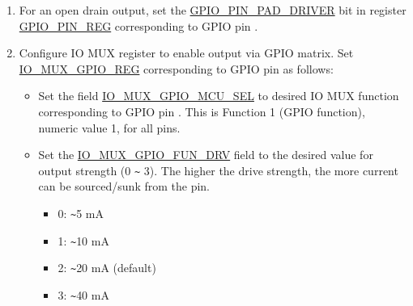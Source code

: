 \documentclass[main\_\_EN.tex]{subfiles}
\begin{document}
\begin{enumerate}
    \begin{itemize}
        \item Set the \hyperref[fielddesc:GPIOFUNCNOUTSEL]{GPIO\_FUNC\_OUT\_SEL} field in register \hyperref[regdesc:GPIOFUNCNOUTSELCFGREG]{GPIO\_FUNC\_OUT\_SEL\_CFG\_REG} to the index of the desired peripheral output signal .
        \item If the signal should always be enabled as an output, set the \hyperref[fielddesc:GPIOFUNCNOENSEL]{GPIO\_FUNC\_OEN\_SEL} bit in register \hyperref[regdesc:GPIOFUNCNOUTSELCFGREG]{GPIO\_FUNC\_OUT\_SEL\_CFG\_REG} and the bit in register \hyperref[regdesc:GPIOENABLEW1TSREG]{GPIO\_ENABLE\_W1TS\_REG}, corresponding to GPIO pin . To have the output enable signal decided by internal logic (for example, the SPIQ\_oe in column ``Output enable signal when \hyperref[fielddesc:GPIOFUNCNOENSEL]{GPIO\_FUNC\_OEN\_SEL} = 0" in Table \ref{tab:iomuxgpio-periph-signals-via-gpio-matrix}), clear the \hyperref[fielddesc:GPIOFUNCNOENSEL]{GPIO\_FUNC\_OEN\_SEL} bit instead.
       \item Set the corresponding bit in register \hyperref[regdesc:GPIOENABLEW1TCREG]{GPIO\_ENABLE\_W1TC\_REG} to disable the output from the GPIO pin.
    \end{itemize}
    \item For an open drain output, set the \hyperref[fielddesc:GPIOPINNPADDRIVER]{GPIO\_PIN\_PAD\_DRIVER} bit in register \hyperref[regdesc:GPIOPINNREG]{GPIO\_PIN\_REG} corresponding to GPIO pin .
    \item Configure IO MUX register to enable output via GPIO matrix. Set \hyperref[regdesc:IOMUXGPIONREG]{IO\_MUX\_GPIO\_REG} corresponding to GPIO pin  as follows:
    \begin{itemize}
        \item Set the field \hyperref[fielddesc:IOMUXGPIONMCUSEL]{IO\_MUX\_GPIO\_MCU\_SEL} to desired IO MUX function corresponding to GPIO pin . This is Function 1 (GPIO function), numeric value 1, for all pins.
        \item Set the \hyperref[fielddesc:IOMUXGPIONFUNDRV]{IO\_MUX\_GPIO\_FUN\_DRV} field to the desired value for output strength (0 \verb+~+ 3). The higher the drive strength, the more current can be sourced/sunk from the pin.
        \begin{itemize}
            \item 0: \verb+~+5 mA
            \item 1: \verb+~+10 mA
            \item 2: \verb+~+20 mA (default)
            \item 3: \verb+~+40 mA
        \end{itemize}


\end{itemize}
\end{enumerate}
\end{document}
